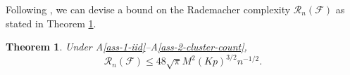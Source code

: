 \documentclass{article}
\newtheorem{thm}{Theorem}[section]
\newtheorem{lemma}{Lemma}[section]
\newtheorem{defn}{Definition}
\begin{document}

Following \cite{paul2021uniform}, we can devise a bound on the Rademacher complexity $\mathcal{R}_n(\mathcal{F})$ as stated in Theorem \ref{thm-1-RnF}.

\begin{thm}\label{thm-1-RnF}
    Under A\ref{ass-1-iid}--A\ref{ass-2-cluster-count}, 
    \begin{equation*}
        \mathcal{R}_n(\mathcal{F})\le 48\sqrt{\pi}M^2(Kp)^{3/2}n^{-1/2}.
    \end{equation*}
\end{thm}
\end{document}

